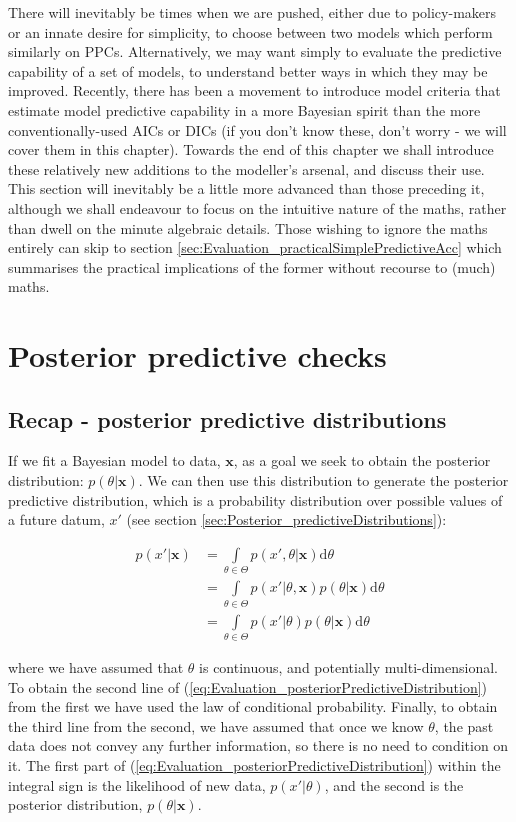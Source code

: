 \documentclass[11pt,fullpage]{book}
\begin{document}
There will inevitably be times when we are pushed, either due to policy-makers or an innate desire for simplicity, to choose between two models which perform similarly on PPCs. Alternatively, we may want simply to evaluate the predictive capability of a set of models, to understand better ways in which they may be improved. Recently, there has been a movement to introduce model criteria that estimate model predictive capability in a more Bayesian spirit than the more conventionally-used AICs or DICs (if you don't know these, don't worry - we will cover them in this chapter). Towards the end of this chapter we shall introduce these relatively new additions to the modeller's arsenal, and discuss their use. This section will inevitably be a little more advanced than those preceding it, although we shall endeavour to focus on the intuitive nature of the maths, rather than dwell on the minute algebraic details. Those wishing to ignore the maths entirely can skip to section \ref{sec:Evaluation_practicalSimplePredictiveAcc} which summarises the practical implications of the former without recourse to (much) maths.

\section{Posterior predictive checks}
\subsection{Recap - posterior predictive distributions}\label{sec:Evaluation_posteriorPredDist}
If we fit a Bayesian model to data, $\boldsymbol{x}$, as a goal we seek to obtain the posterior distribution: $p(\theta|\boldsymbol{x})$. We can then use this distribution to generate the posterior predictive distribution, which is a probability distribution over possible values of a future datum, $x'$ (see section \ref{sec:Posterior_predictiveDistributions}):

\begin{align}\label{eq:Evaluation_posteriorPredictiveDistribution}
p(x'|\boldsymbol{x}) &= \int\limits_{\theta\in\Theta} p(x',\theta|\boldsymbol{x}) \mathrm{d}\theta\\
&= \int\limits_{\theta\in\Theta} p(x'|\theta,\boldsymbol{x}) p(\theta|\boldsymbol{x}) \mathrm{d}\theta\\
&= \int\limits_{\theta\in\Theta} p(x'|\theta) p(\theta|\boldsymbol{x}) \mathrm{d}\theta
\end{align}

where we have assumed that $\theta$ is continuous, and potentially multi-dimensional. To obtain the second line of (\ref{eq:Evaluation_posteriorPredictiveDistribution}) from the first we have used the law of conditional probability. Finally, to obtain the third line from the second, we have assumed that once we know $\theta$, the past data does not convey any further information, so there is no need to condition on it. The first part of (\ref{eq:Evaluation_posteriorPredictiveDistribution}) within the integral sign is the likelihood of new data, $p(x'|\theta)$, and the second is the posterior distribution, $p(\theta|\boldsymbol{x})$. 
\end{document}
